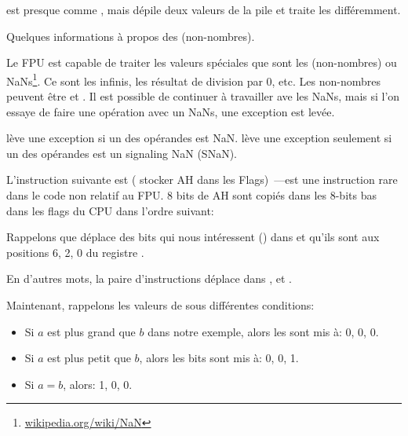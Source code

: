 



\FUCOMPP{} est presque comme \FCOM, mais dépile deux valeurs de la pile et traite
les  différemment.

Quelques informations à propos des  (non-nombres).

\newcommand{\NANFN}{\footnote{\href{http://go.yurichev.com/17130}{wikipedia.org/wiki/NaN}}}

Le FPU est capable de traiter les valeurs spéciales que sont les 
(non-nombres) ou \gls{NaN}s\NANFN.
Ce sont les infinis, les résultat de division par 0, etc.
Les non-nombres peuvent être  et . Il est possible de continuer
à travailler ave les  NaNs, mais si l'on essaye de faire une opération avec
un  NaNs, une exception est levée.


\FCOM lève une exception si un des opérandes est \gls{NaN}.
\FUCOM lève une exception seulement si un des opérandes est un signaling \gls{NaN}
(SNaN).

\label{SAHF}

L'instruction suivante est \SAHF ( stocker AH dans les Flags)~---est
une instruction rare dans le code non relatif au FPU.
8 bits de AH sont copiés dans les 8-bits bas dans les flags du CPU dans l'ordre suivant:




Rappelons que \FNSTSW déplace des bits qui nous intéressent (\CThreeBits) dans \AH
et qu'ils sont aux positions 6, 2, 0 du registre \AH.



En d'autres mots, la paire d'instructions  déplace \CThreeBits
dans \ZF, \PF et \CF.

Maintenant, rappelons les valeurs de \CThreeBits sous différentes conditions:

\begin{itemize}
\item Si $a$ est plus grand que $b$ dans notre exemple, alors les \CThreeBits sont
mis à: 0, 0, 0.
\item Si $a$ est plus petit que $b$, alors les bits sont mis à: 0, 0, 1.
\item Si $a=b$, alors: 1, 0, 0.
\end{itemize}

